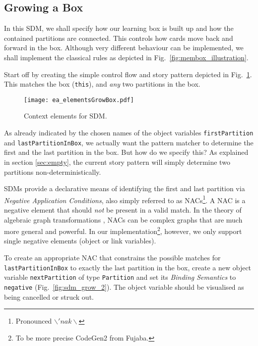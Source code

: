 \subsection{Growing a Box}
	
In this SDM, we shall specify how our learning box is built up and how the contained partitions are connected. This controls how cards move back and forward in
the box. Although very different behaviour can be implemented, we shall implement the classical rules as depicted in Fig.~\ref{fig:membox_illustration}.

Start off by creating the simple control flow and story pattern depicted in Fig.~\ref{fig:sdm_grow_1}. This matches the box (\texttt{this}), and \emph{any} two
partitions in the box.
	
\begin{figure}[htbp]
\begin{center}
  \texttt{[image: ea\_elementsGrowBox.pdf]}
  \caption{Context elements for SDM.}  
  \label{fig:sdm_grow_1}
\end{center}
\end{figure}

As already indicated by the chosen names of the object variables \texttt{first\-Partition} and \texttt{last\-Partition\-In\-Box}, we actually want the pattern
matcher to determine the first and the last partition in the box. But how do we specify this?  As explained in section \ref{sec:empty}, the current story
pattern will simply determine two partitions non-deterministically.

SDMs provide a declarative means of identifying the first and last partition via \emph{Negative Application Conditions}, also simply referred to as
\mbox{NACs}\footnote{Pronounced $\backslash 'nak \backslash$}. A \mbox{NAC} is a negative element that should \emph{not} be present in a valid
 match. In the theory of algebraic graph transformations \cite{EEPT06}, \mbox{NACs} can be complex graphs that are much more general and
powerful. In our implementation\footnote{To be more precise CodeGen2 from Fujaba.}, however, we only support single negative elements (object or link
variables).

To create an appropriate \mbox{NAC} that constrains the possible matches for \texttt{lastPartitionInBox} to exactly the last partition in the box, create a new
object variable \texttt{nextPartition} of type \texttt{Partition} and set  its \emph{Binding Semantics} to \texttt{negative}
(Fig.~\ref{fig:sdm_grow_2}). The object variable should be visualised as being cancelled or struck out.
 
